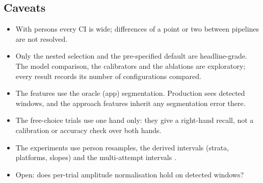 
\subsection{Caveats}\label{app:m2:caveats}

\begin{itemize}
  \item With  persons every CI is wide; differences of a point or two between pipelines are
  not resolved.
  \item Only the nested selection and the pre-specified default are headline-grade. The model comparison, the
  calibrators and the ablations are exploratory; every result records its number of configurations compared.
  \item The features use the oracle (app) segmentation. Production sees detected windows, and the approach
  features inherit any segmentation error there.
  \item The free-choice trials use one hand only: they give a right-hand recall, not a calibration or accuracy
  check over both hands.
  \item The experiments use  person resamples, the derived intervals (strata, platforms, slopes)
   and the multi-attempt intervals .
  \item Open: does per-trial amplitude normalisation hold on detected windows?
\end{itemize}

\FloatBarrier
